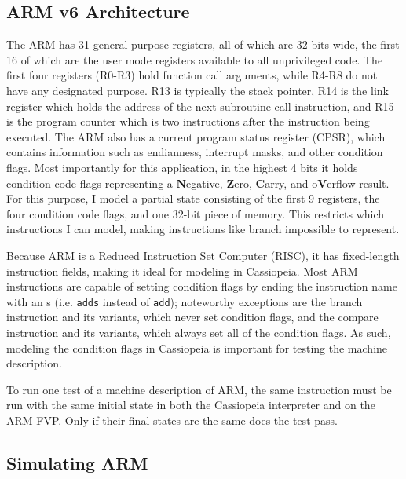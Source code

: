 \documentclass[letterpaper,12pt]{article}
\begin{document}
\subsection{ARM v6 Architecture}


The ARM has 31 general-purpose registers, all of which are 32 bits wide, the first 16 of which are the user mode registers available to all unprivileged code. The first four registers (R0-R3) hold function call arguments, while R4-R8 do not have any designated purpose. R13 is typically the stack pointer, R14 is the link register which holds the address of the next subroutine call instruction, and R15 is the program counter which is two instructions after the instruction being executed. The ARM also has a current program status register (CPSR), which contains information such as endianness, interrupt masks, and other condition flags. Most importantly for this application, in the highest 4 bits it holds condition code flags representing a \textbf{N}egative, \textbf{Z}ero, \textbf{C}arry, and o\textbf{V}erflow result. For this purpose, I model a partial state consisting of the first 9 registers, the four condition code flags, and one 32-bit piece of memory. This restricts which instructions I can model, making instructions like branch impossible to represent.

Because ARM is a Reduced Instruction Set Computer (RISC), it has fixed-length instruction fields, making it ideal for modeling in Cassiopeia. Most ARM instructions are capable of setting condition flags by ending the instruction name with an s (i.e. \texttt{adds} instead of \texttt{add}); noteworthy exceptions are the branch instruction and its variants, which never set condition flags, and the compare instruction and its variants, which always set all of the condition flags. As such, modeling the condition flags in Cassiopeia is important for testing the machine description.

To run one test of a machine description of ARM, the same instruction must be run with the same initial state in both the Cassiopeia interpreter and on the ARM FVP. Only if their final states are the same does the test pass.

\subsection{Simulating ARM}

\end{document}
